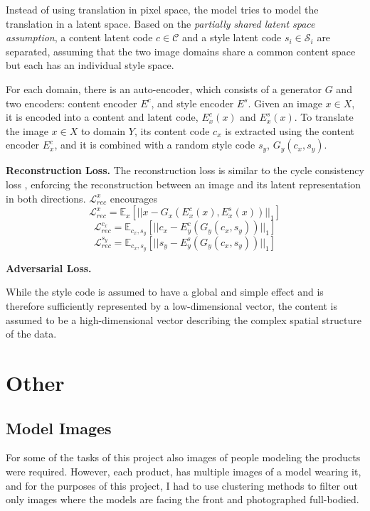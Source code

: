 \documentclass{article}
\begin{document}
Instead of using translation in pixel space, the model tries to model the translation in a latent space. Based on the \textit{partially shared latent space assumption}, a content latent code $c \in \mathcal{C}$ and a style latent code $s_{i} \in \mathcal{S}_{i}$ are separated, assuming that the two image domains share a common content space but each has an individual style space. 

For each domain, there is an auto-encoder, which consists of a generator $G$ and two encoders: content encoder $E^c$, and style encoder $E^s$. Given an image $x \in X$, it is encoded into a content and latent code, $E^c_x(x)$ and $E^s_x(x)$. To translate the image $x \in X$ to domain $Y$, its content code $c_{x}$ is extracted using the content encoder $E^c_x$, and it is combined with a random style code $s_{y}$, $G_y(c_x, s_y)$.


\textbf{Reconstruction Loss.}
The reconstruction loss is similar to the cycle consistency loss \cite{zhu_unpaired_2017}, enforcing the reconstruction between an image and its latent representation in both directions. $\mathcal{L}^{x}_{rec}$ encourages 
\begin{equation}
\mathcal{L}^{x}_{rec} = \mathbb{E}_{x}[||x - G_{x}(E^{c}_{x}(x), E^{s}_{x}(x))||_{1}]
\end{equation}
\begin{equation}
\mathcal{L}^{c_{x}}_{rec} = \mathbb{E}_{c_{x}, s_{y}}[||c_{x} - E^{c}_{y}(G_{y}(c_{x},s_{y}))||_{1}]
\end{equation}
\begin{equation}
\mathcal{L}^{s_{y}}_{rec} = \mathbb{E}_{c_{x}, s_{y}}[||s_{y} - E^{s}_{y}(G_{y}(c_{x},s_{y}))||_{1}]
\end{equation}


\textbf{Adversarial Loss.}



While the style code is assumed to have a global and simple effect and is therefore sufficiently represented by a low-dimensional vector, the content is assumed to be a high-dimensional vector describing the complex spatial structure of the data.


\section{Other}

\subsection{Model Images}
For some of the tasks of this project also images of people modeling the products were required.  However, each product, has multiple images of a model wearing it, and for the purposes of this project, I had to use clustering methods to filter out only images where the models are facing the front and photographed full-bodied.
\end{document}
